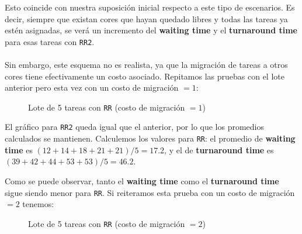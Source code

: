 Esto coincide con nuestra suposición inicial respecto a este tipo de escenarios. Es decir, siempre que existan cores que hayan quedado libres y todas las tareas ya estén asignadas, se verá un incremento del \textbf{waiting time} y el \textbf{turnaround time} para esas tareas con \texttt{RR2}.
\\\\
Sin embargo, este esquema no es realista, ya que la migración de tareas a otros cores tiene efectivamente un costo asociado. Repitamos las pruebas con el lote anterior pero esta vez con un costo de migración $= 1$:

\begin{figure}[h!t]
  \centering
  \caption{Lote de 5 tareas con \texttt{RR} (costo de migración $= 1$)}
  \label{fig:fig81}
\end{figure}

\FloatBarrier
El gráfico para \texttt{RR2} queda igual que el anterior, por lo que los promedios calculados se mantienen. Calculemos los valores para \texttt{RR}: el promedio de \textbf{waiting time} es $(12 + 14 + 18 + 21 + 21) / 5 = 17.2$, y el de \textbf{turnaround time} es $(39 + 42 + 44 + 53 + 53) / 5 = 46.2$.

Como se puede observar, tanto el \textbf{waiting time} como el \textbf{turnaround time} sigue siendo menor para \texttt{RR}.
Si reiteramos esta prueba con un costo de migración $= 2$ tenemos:

\begin{figure}[h!t]
  \centering
  \caption{Lote de 5 tareas con \texttt{RR} (costo de migración $= 2$)}
  \label{fig:fig82}
\end{figure}

